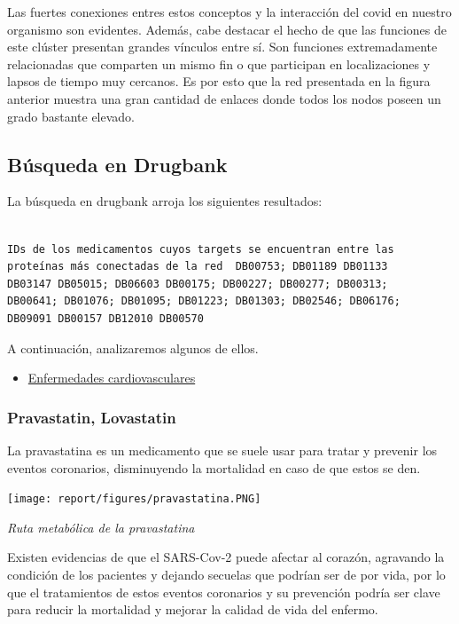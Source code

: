 Las fuertes conexiones entres estos conceptos y la interacción del covid en nuestro organismo son evidentes. Además, cabe destacar el hecho de que las funciones de este clúster presentan grandes vínculos entre sí. Son funciones extremadamente relacionadas que comparten un mismo fin o que participan en localizaciones y lapsos de tiempo muy cercanos. Es por esto que la red presentada en la figura anterior muestra una gran cantidad de enlaces donde todos los nodos poseen un grado bastante elevado.

\subsection{Búsqueda en Drugbank}

La búsqueda en drugbank arroja los siguientes resultados:

\begin{lstlisting}

IDs de los medicamentos cuyos targets se encuentran entre las
proteínas más conectadas de la red  DB00753; DB01189 DB01133 
DB03147 DB05015; DB06603 DB00175; DB00227; DB00277; DB00313;
DB00641; DB01076; DB01095; DB01223; DB01303; DB02546; DB06176;
DB09091 DB00157 DB12010 DB00570
\end{lstlisting}

A continuación, analizaremos algunos de ellos.\newline


\begin{itemize}
    \item \underline{Enfermedades cardiovasculares}
\end{itemize}


\subsubsection{Pravastatin, Lovastatin}

La pravastatina es un medicamento que se suele usar para tratar y prevenir los eventos coronarios, disminuyendo la mortalidad en caso de que estos se den.


\begin{center}

\texttt{[image: report/figures/pravastatina.PNG]}

\caption{\textit{Ruta metabólica de la pravastatina }}

\end{center}

 Existen evidencias de que el SARS-Cov-2 puede afectar al corazón\cite{Oudit2009SARS-coronavirusSARS}, agravando la condición de los pacientes y dejando secuelas que podrían ser
 de por vida, por lo que el tratamientos de estos eventos coronarios y su prevención podría ser clave para reducir la mortalidad y mejorar la calidad de vida del enfermo.

